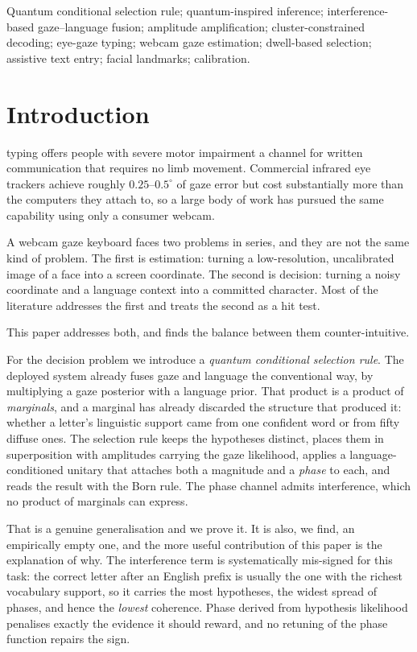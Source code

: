 \documentclass[conference]{IEEEtran}
\begin{document}
\begin{IEEEkeywords}
Quantum conditional selection rule; quantum-inspired inference;
interference-based gaze--language fusion; amplitude amplification;
cluster-constrained decoding; eye-gaze typing; webcam gaze estimation;
dwell-based selection; assistive text entry; facial landmarks; calibration.
\end{IEEEkeywords}

\IEEEpeerreviewmaketitle

\section{Introduction}

 typing offers people with severe motor impairment a channel
for written communication that requires no limb movement. Commercial infrared
eye trackers achieve roughly $0.25$--$0.5^\circ$ of gaze error but cost
substantially more than the computers they attach to, so a large body of work
has pursued the same capability using only a consumer webcam.

A webcam gaze keyboard faces two problems in series, and they are not the same
kind of problem. The first is estimation: turning a low-resolution, uncalibrated
image of a face into a screen coordinate. The second is decision: turning a noisy
coordinate and a language context into a committed character. Most of the
literature addresses the first and treats the second as a hit test.

This paper addresses both, and finds the balance between them counter-intuitive.

For the decision problem we introduce a \emph{quantum conditional selection
rule}. The deployed system already fuses gaze and language the conventional way,
by multiplying a gaze posterior with a language prior. That product is a product
of \emph{marginals}, and a marginal has already discarded the structure that
produced it: whether a letter's linguistic support came from one confident word
or from fifty diffuse ones. The selection rule keeps the hypotheses distinct,
places them in superposition with amplitudes carrying the gaze likelihood,
applies a language-conditioned unitary that attaches both a magnitude and a
\emph{phase} to each, and reads the result with the Born rule. The phase channel
admits interference, which no product of marginals can express.

That is a genuine generalisation and we prove it. It is also, we find, an
empirically empty one, and the more useful contribution of this paper is the
explanation of why. The interference term is systematically mis-signed for this
task: the correct letter after an English prefix is usually the one with the
richest vocabulary support, so it carries the most hypotheses, the widest spread
of phases, and hence the \emph{lowest} coherence. Phase derived from hypothesis
likelihood penalises exactly the evidence it should reward, and no retuning of
the phase function repairs the sign.
\end{document}
